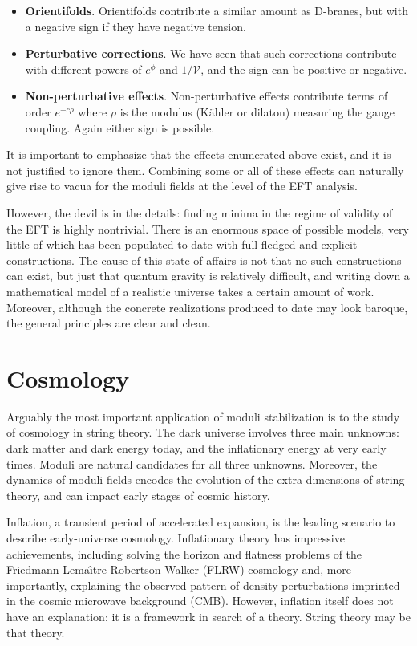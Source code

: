 \documentclass[12pt,a4wide]{article}
\def\V{\mathcal{V}}
\begin{document}
\begin{itemize}
\item{\bf Orientifolds}. Orientifolds contribute a similar amount as D-branes, but with a negative sign if they have negative tension.

\item{\bf Perturbative corrections}. We have seen that such corrections contribute with different powers of $e^\phi$ and $1/\V$, and the sign can be positive or negative.

\item{\bf Non-perturbative effects}. Non-perturbative effects contribute terms of order $e^{-c\rho}$ where $\rho$ is the modulus (K\"ahler or dilaton) measuring the gauge coupling. Again either sign is possible.
\end{itemize}

It is important to emphasize that the effects enumerated above exist, and it is not justified to ignore them. 
Combining some or all of these effects can naturally give rise to vacua for the moduli fields at the level of the EFT analysis.

However, the devil is in the details: finding minima in the
regime of validity of the EFT is highly nontrivial.
There is an enormous space of possible models, very little of which has been populated to date with full-fledged and explicit constructions.
The cause of this state of affairs is not that no such constructions can exist, but just that quantum gravity is relatively difficult, and writing down a mathematical model of a realistic universe takes a certain amount of work.  Moreover, although the concrete realizations produced to date may look baroque, the general principles are clear and clean.



\section{Cosmology}

Arguably the most important application of moduli stabilization is to the study of cosmology in string theory.
The dark universe involves three main unknowns: dark matter and dark energy today, and the inflationary energy at very early times.  Moduli are natural candidates for all three unknowns.
Moreover, the dynamics of moduli fields encodes the evolution of the extra dimensions of string theory, and can impact early stages of cosmic history.


Inflation, a transient period of accelerated expansion, is the leading scenario to describe early-universe cosmology.  Inflationary theory has impressive achievements, including solving the horizon and flatness problems of the Friedmann-Lema\^{\i}tre-Robertson-Walker (FLRW) cosmology and, more importantly, explaining the observed pattern of density perturbations imprinted in the cosmic microwave background (CMB). However, inflation itself does not have an explanation: it is a framework in search of a theory. String theory may be that theory. 
\end{document}
